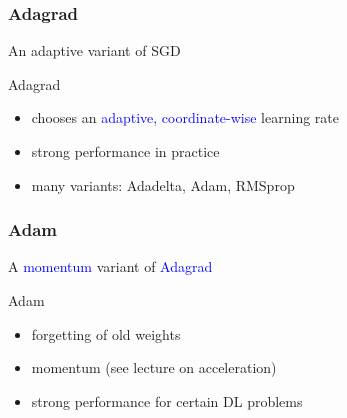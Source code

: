 \documentclass[aspectratio=149]{beamer}
\begin{document}
\begin{frame}
  \frametitle{Adagrad}
  An adaptive variant of SGD
  \begin{algorithm}[H]
    \caption{Adagrad}\label{label:}
    \begin{algorithmic}[1]
      \Endfor
    \end{algorithmic}
  \end{algorithm}
  \begin{itemize}
    \item chooses an \textcolor{blue}{adaptive, coordinate-wise} learning rate
    \item strong performance in practice
    \item many variants: Adadelta, Adam, RMSprop
  \end{itemize}
\end{frame}

\begin{frame}
  \frametitle{Adam}
  A \textcolor{blue}{momentum} variant of \textcolor{blue}{Adagrad}
  \begin{algorithm}[H]
    \caption{Adam}\label{label:}
    \begin{algorithmic}[1]
      \Endfor
    \end{algorithmic}
  \end{algorithm}
  \begin{itemize}
    \item forgetting of old weights
    \item momentum (see lecture on acceleration)
    \item strong performance for certain DL problems
  \end{itemize}
\end{frame}
\end{document}

